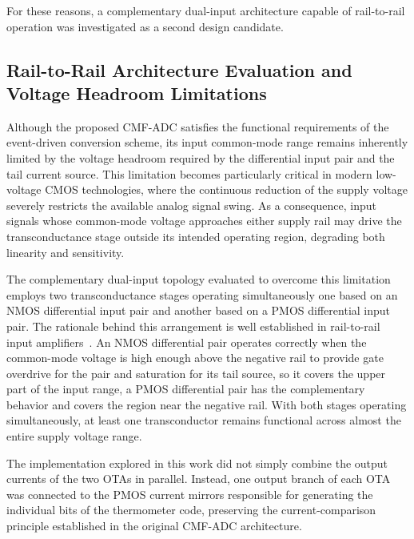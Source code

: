 For these reasons, a complementary dual-input architecture capable of rail-to-rail operation was investigated as a second design candidate.


\subsection{Rail-to-Rail Architecture Evaluation and Voltage Headroom Limitations}

Although the proposed CMF-ADC satisfies the functional requirements of the
event-driven conversion scheme, its input common-mode range remains inherently
limited by the voltage headroom required by the differential input pair and
the tail current source. This limitation becomes particularly critical in
modern low-voltage CMOS technologies, where the continuous reduction of the
supply voltage severely restricts the available analog signal swing. As a
consequence, input signals whose common-mode voltage approaches either supply
rail may drive the transconductance stage outside its intended operating
region, degrading both linearity and sensitivity.

The complementary dual-input topology evaluated to overcome this limitation
employs two transconductance stages operating simultaneously one based on an
NMOS differential input pair and another based on a PMOS differential input pair.
The rationale behind this arrangement is well established in rail-to-rail
input amplifiers~\cite{razavi}. An NMOS differential pair operates correctly
when the common-mode voltage is high enough above the negative rail to provide
gate overdrive for the pair and saturation for its tail source, so it covers
the upper part of the input range, a PMOS differential pair has the
complementary behavior and covers the region near the negative rail. With
both stages operating simultaneously, at least one transconductor remains
functional across almost the entire supply voltage range.

The implementation explored in this work did not simply combine the output
currents of the two OTAs in parallel. Instead, one output branch of each OTA
was connected to the PMOS current mirrors responsible for generating the
individual bits of the thermometer code, preserving the current-comparison
principle established in the original CMF-ADC architecture.

